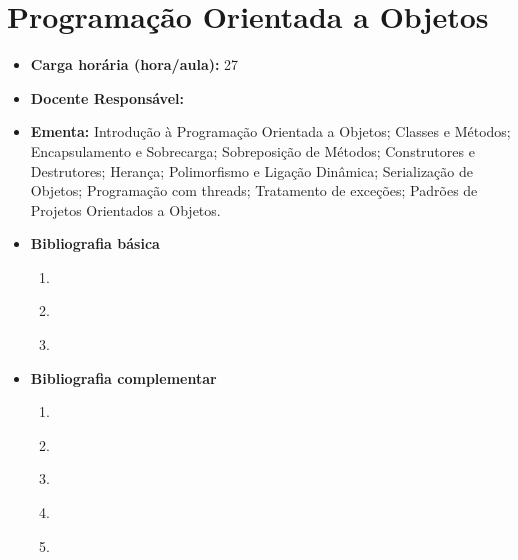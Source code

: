 \documentclass[11pt,fleqn]{book} %
\begin{document}
\section{Programação Orientada a Objetos}\label{3_poo}
\begin{itemize}
	\item \textbf{Carga horária (hora/aula):} 27
	\item \textbf{Docente Responsável:}~
	\item \textbf{Ementa:} 
	Introdução à Programação Orientada a Objetos; 
	Classes e Métodos; 
	Encapsulamento e Sobrecarga; 
	Sobreposição de Métodos; 
	Construtores e Destrutores;
	Herança; 
	Polimorfismo e Ligação Dinâmica; 
	Serialização de Objetos; 
	Programação com threads; 
	Tratamento de exceções;
	Padrões de Projetos Orientados a Objetos.
    
	\item \textbf{Bibliografia básica}
	\begin{enumerate}
		\item \cite{deitel_deitel_2010}
		\item \cite{santos_2003}
		\item \cite{goncalves_2007}
		
	\end{enumerate}
	\item \textbf{Bibliografia complementar}
	\begin{enumerate}
		\item \cite{gamma_helm_johnson_vlissides_2000}
		\item \cite{wazlawick2011analise}
		\item \cite{mclaughlin_pollice_west_2010}
		\item \cite{deitel_deitel_2006}
		\item \cite{fowler_tortello_2005}
	\end{enumerate}	
\end{itemize}



\newpage
\end{document}

